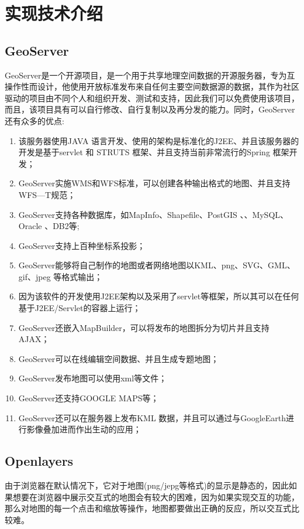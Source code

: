 
\chapter{实现技术介绍}



\section{GeoServer}
  GeoServer是一个开源项目，是一个用于共享地理空间数据的开源服务器，专为互操作性而设计，他使用开放标准发布来自任何主要空间数据源的数据，其作为社区驱动的项目由不同个人和组织开发、测试和支持，因此我们可以免费使用该项目，而且，该项目具有可以自行修改、自行复制以及再分发的能力。同时，GeoServer还有众多的优点:


\begin{enumerate}
 
   \item 该服务器使用JAVA 语言开发、使用的架构是标准化的J2EE、并且该服务器的开发是基于servlet 和 STRUTS 框架、并且支持当前非常流行的Spring 框架开发；
   \item GeoServer实施WMS和WFS标准，可以创建各种输出格式的地图、并且支持WFS—T规范；
   \item GeoServer支持各种数据库，如MapInfo、Shapefile、PostGIS 、、MySQL、Oracle 、DB2等;
   \item GeoServer支持上百种坐标系投影；
   \item GeoServer能够将自己制作的地图或者网络地图以KML、png、SVG、GML、gif、jpeg 等格式输出；
   \item 因为该软件的开发使用J2EE架构以及采用了servlet等框架，所以其可以在任何基于J2EE/Servlet的容器上运行；
   \item GeoServer还嵌入MapBuilder，可以将发布的地图拆分为切片并且支持AJAX；
   \item GeoServer可以在线编辑空间数据、并且生成专题地图；
   \item GeoServer发布地图可以使用xml等文件；
   \item GeoServer还支持GOOGLE MAPS等；
   \item GeoServer还可以在服务器上发布KML 数据，并且可以通过与GoogleEarth进行影像叠加进而作出生动的应用；
\end{enumerate}


\section{Openlayers}
由于浏览器在默认情况下，它对于地图(png/jepg等格式)的显示是静态的，因此如果想要在浏览器中展示交互式的地图会有较大的困难，因为如果实现交互的功能，那么对地图的每一个点击和缩放等操作，地图都要做出正确的反应，所以交互式比较难。


